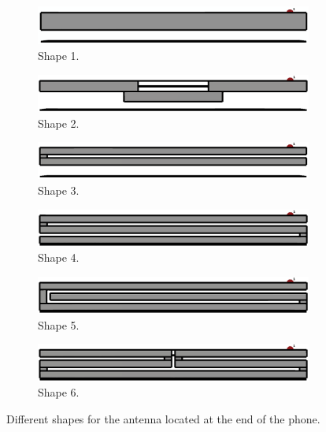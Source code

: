 \begin{figure}[H]
    \centering
    \begin{subfigure}[b]{0.49\textwidth}
        \includegraphics[width=\textwidth]{img/shape1.eps}
        \caption{Shape 1.}
        \label{fig:shape1}
    \end{subfigure}
    \begin{subfigure}[b]{0.49\textwidth}
        \includegraphics[width=\textwidth]{img/shape2.eps}
        \caption{Shape 2.}
        \label{fig:shape2}
    \end{subfigure}
    
    \begin{subfigure}[b]{0.49\textwidth}
        \includegraphics[width=\textwidth]{img/shape3.eps}
        \caption{Shape 3.}
        \label{fig:shape3}
    \end{subfigure}
    \begin{subfigure}[b]{0.49\textwidth}
        \includegraphics[width=\textwidth]{img/shape4.eps}
        \caption{Shape 4.}
        \label{fig:shape4}
    \end{subfigure}
    
    \begin{subfigure}[b]{0.49\textwidth}
        \includegraphics[width=\textwidth]{img/shape5.eps}
        \caption{Shape 5.}
        \label{fig:shape5}
    \end{subfigure}
    \begin{subfigure}[b]{0.49\textwidth}
        \includegraphics[width=\textwidth]{img/shape6.eps}
        \caption{Shape 6.}
        \label{fig:shape6}
    \end{subfigure}
    \caption{Different shapes for the antenna located at the end of the phone.}
    \label{fig:shape_models}
\end{figure}


